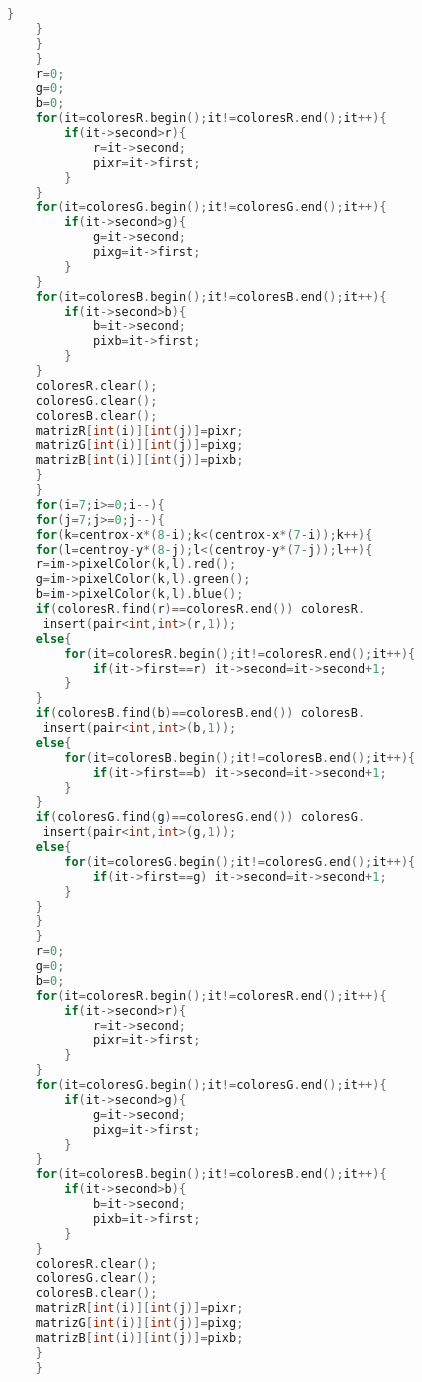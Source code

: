 \documentclass{article}
\begin{document}
\begin{lstlisting}[language=C++, label=Muestreo]
        }
    }
    }
    }
    r=0;
    g=0;
    b=0;
    for(it=coloresR.begin();it!=coloresR.end();it++){
        if(it->second>r){
            r=it->second;
            pixr=it->first;
        }
    }
    for(it=coloresG.begin();it!=coloresG.end();it++){
        if(it->second>g){
            g=it->second;
            pixg=it->first;
        }
    }
    for(it=coloresB.begin();it!=coloresB.end();it++){
        if(it->second>b){
            b=it->second;
            pixb=it->first;
        }
    }
    coloresR.clear();
    coloresG.clear();
    coloresB.clear();
    matrizR[int(i)][int(j)]=pixr;
    matrizG[int(i)][int(j)]=pixg;
    matrizB[int(i)][int(j)]=pixb;
    }
    }
    for(i=7;i>=0;i--){
    for(j=7;j>=0;j--){
    for(k=centrox-x*(8-i);k<(centrox-x*(7-i));k++){
    for(l=centroy-y*(8-j);l<(centroy-y*(7-j));l++){
    r=im->pixelColor(k,l).red();
    g=im->pixelColor(k,l).green();
    b=im->pixelColor(k,l).blue();
    if(coloresR.find(r)==coloresR.end()) coloresR.
     insert(pair<int,int>(r,1));
    else{
        for(it=coloresR.begin();it!=coloresR.end();it++){
            if(it->first==r) it->second=it->second+1;
        }
    }
    if(coloresB.find(b)==coloresB.end()) coloresB.
     insert(pair<int,int>(b,1));
    else{
        for(it=coloresB.begin();it!=coloresB.end();it++){
            if(it->first==b) it->second=it->second+1;
        }
    }
    if(coloresG.find(g)==coloresG.end()) coloresG.
     insert(pair<int,int>(g,1));
    else{
        for(it=coloresG.begin();it!=coloresG.end();it++){
            if(it->first==g) it->second=it->second+1;
        }
    }
    }
    }
    r=0;
    g=0;
    b=0;
    for(it=coloresR.begin();it!=coloresR.end();it++){
        if(it->second>r){
            r=it->second;
            pixr=it->first;
        }
    }
    for(it=coloresG.begin();it!=coloresG.end();it++){
        if(it->second>g){
            g=it->second;
            pixg=it->first;
        }
    }
    for(it=coloresB.begin();it!=coloresB.end();it++){
        if(it->second>b){
            b=it->second;
            pixb=it->first;
        }
    }
    coloresR.clear();
    coloresG.clear();
    coloresB.clear();
    matrizR[int(i)][int(j)]=pixr;
    matrizG[int(i)][int(j)]=pixg;
    matrizB[int(i)][int(j)]=pixb;
    }
    }


\end{lstlisting}
\end{document}
